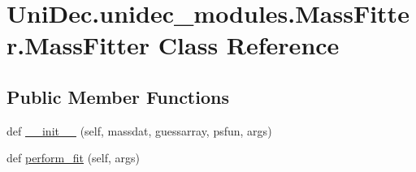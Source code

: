 \hypertarget{class_uni_dec_1_1unidec__modules_1_1_mass_fitter_1_1_mass_fitter}{}\section{Uni\+Dec.\+unidec\+\_\+modules.\+Mass\+Fitter.\+Mass\+Fitter Class Reference}
\label{class_uni_dec_1_1unidec__modules_1_1_mass_fitter_1_1_mass_fitter}
\subsection*{Public Member Functions}
\begin{DoxyCompactItemize}
\item 
def \hyperlink{class_uni_dec_1_1unidec__modules_1_1_mass_fitter_1_1_mass_fitter_a25900c7518d2bb9d028855ac926efc66}{\+\_\+\+\_\+init\+\_\+\+\_\+} (self, massdat, guessarray, psfun, args)
\item 
def \hyperlink{class_uni_dec_1_1unidec__modules_1_1_mass_fitter_1_1_mass_fitter_a28bb5518c5b2a6bf6765baead0e78b41}{perform\+\_\+fit} (self, args)
\end{DoxyCompactItemize}
